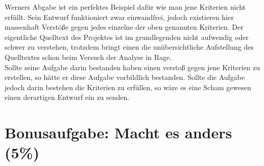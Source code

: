 \documentclass{pi1}
\begin{document}
Werners Abgabe ist ein perfektes Beispiel dafür wie man jene Kriterien nicht erfüllt.
Sein Entwurf funktioniert zwar einwandfrei, jedoch existieren hier massenhaft Verstöße gegen jedes einzelne der oben genannten Kriterien.\newline
Der eigentliche Quelltext des Projektes ist im grundlegenden nicht aufwendig oder schwer zu verstehen, trotzdem bringt einen die unübersichtliche Aufstellung des Quelltextes schon beim Versuch der Analyse in Rage.\\
Sollte seine Aufgabe darin bestanden haben einen verstoß gegen jene Kriterien zu erstellen, so hätte er diese Aufgabe vorbildlich bestanden.
Sollte die Aufgabe jedoch darin bestehen die Kriterien zu erfüllen, so wäre es eine Scham gewesen einen derartigen Entwurf ein zu senden.

\section{Bonusaufgabe: Macht es anders (5\%)}
\end{document}
